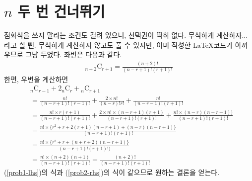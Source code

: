 \documentclass{scrartcl}
\title{\doctitle}
\author{Project Eclipse (손량)}
\date{Last compiled on: \today, \currenttime}
\newcommand{\combi}[2]{{}_{#1}\mathrm{C}_{#2}}
\begin{document}
\maketitle

\section{\texorpdfstring{\(n\)}{n} 두 번 건너뛰기}
점화식을 쓰지 말라는 조건도 걸려 있으니, 선택권이 딱히 없다. 무식하게 계산하자... 라고 할 뻔. 무식하게 계산하지 않고도 풀 수 있지만, 이미 작성한 \LaTeX 코드가 아까우므로 그냥 두었다. 좌변은 다음과 같다.
\begin{align}\label{prob1-lhs}
  \combi{n+2}{r+1}=\frac{(n+2)!}{(n-r+1)!(r+1)!}
\end{align}
한편, 우변을 계산하면
\begin{align}
  &\combi{n}{r-1}+2\combi{n}{r}+\combi{n}{r+1} \nonumber \\
  &=\frac{n!}{(n-r+1)!(r-1)!}+\frac{2\times n!}{(n-r)!r!}+\frac{n!}{(n-r-1)!(r+1)!} \nonumber \\
  &=\frac{n!\times r(r+1)}{(n-r+1)!(r+1)!}+\frac{2\times n!\times(n-r+1)(r+1)}{(n-r+1)!(r+1)!}+\frac{n!\times(n-r)(n-r+1))}{(n-r+1)!(r+1)!} \nonumber \\
  &=\frac{n!\times\{r^2+r+2(r+1)(n-r+1)+(n-r)(n-r+1)\}}{(n-r+1)!(r+1)!} \nonumber \\
  &=\frac{n!\times\{r^2+r+(n+r+2)(n-r+1)\}}{(n-r+1)!(r+1)!)} \nonumber \\
  \label{prob2-rhs} &=\frac{n!\times(n+2)(n+1)}{(n-r+1)!(r+1)!}=\frac{(n+2)!}{(n-r+1)!(r+1)!}
\end{align}
(\ref{prob1-lhs})의 식과 (\ref{prob2-rhs})의 식이 같으므로 원하는 결론을 얻는다.
\end{document}
